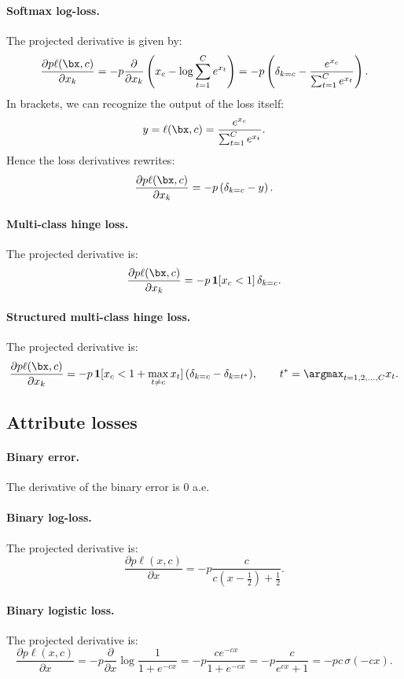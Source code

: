 \paragraph{Softmax log-loss.} The projected derivative is given by:
\[
\frac{\partial p \ell(\bx,c)}{\partial x_k}
=
- p \frac{\partial}{\partial x_k}
\left(x_c - \log \sum_{t=1}^C e^{x_t}\right)
=
- p \left(\delta_{k=c} - \frac{e^{x_c}}{\sum_{t=1}^C e^{x_t}} \right).
\]
In brackets, we can recognize the output of the loss itself:
\[
 y = \ell(\bx,c) = \frac{e^{x_c}}{\sum_{t=1}^C e^{x_t}}.
\]
Hence the loss derivatives rewrites:
\[
\frac{\partial p \ell(\bx,c)}{\partial x_k}
=
- p \left(\delta_{k=c} - y \right).
\]

\paragraph{Multi-class hinge loss.} The projected derivative is:
\[
\frac{\partial p \ell(\bx,c)}{\partial x_k}
=
- p\,\mathbf{1}[x_c < 1]\,\delta_{k=c}.
\]

\paragraph{Structured multi-class hinge loss.} The projected derivative is:
\[
\frac{\partial p \ell(\bx,c)}{\partial x_k}
=
- p\,\mathbf{1}[x_c < 1 + \max_{t\not= c} x_t]\,(\delta_{k=c} - \delta_{k=t^*}),
\qquad
t^* = \argmax_{t =1,2,\dots,C} x_t.
\]

\subsection{Attribute losses}\label{s:impl-loss-attribute}

\paragraph{Binary error.} The derivative of the binary error is 0 a.e.

\paragraph{Binary log-loss.} The projected derivative is:
\[
\frac{\partial p \ell(x,c)}{\partial x}
=
- p \frac{c}{c \left(x - \frac{1}{2}\right) + \frac{1}{2}}.
\]

\paragraph{Binary logistic loss.} The projected derivative is:
\[
\frac{\partial p \ell(x,c)}{\partial x}
=
- p \frac{\partial}{\partial x} \log \frac{1}{1+e^{-cx}}
=
- p \frac{c e^{-cx}}{1 + e^{-cx}}
=
- p \frac{c}{e^{cx} + 1}
=
- pc\, \sigma(-cx).
\]

